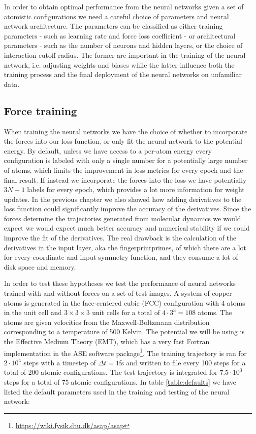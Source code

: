 In order to obtain optimal performance from the neural networks
given a set of atomistic configurations we need a careful choice of parameters
and neural network architecture. The parameters can be classified as either
training parameters - such as learning rate and force loss coefficient -
or architectural parameters - such as the number of neurons and hidden layers,
or the choice of interaction cutoff radius. The former are important
in the training of the neural network, i.e. adjusting weights and biases
while the latter influence both the training process and the final
deployment of the neural networks on unfamiliar data.

\subsection{Force training}
When training the neural networks we have the choice of whether
to incorporate the forces into our loss function, or only fit
the neural network to the potential energy. By default, unless
we have access to a per-atom energy every configuration is labeled
with only a single number for a potentially large number of atoms,
which limits the improvement in loss metrics for every epoch
and the final result. If instead we incorporate the forces into the
loss we have potentially $3N + 1$ labels for every epoch,
which provides a lot more information for weight updates.
In the previous chapter we also showed how adding derivatives to
the loss function could significantly improve the accuracy of the
derivatives. Since the forces determine the trajectories generated
from molecular dynamics we would expect we would expect much better
accuracy and numerical stability if we could improve the fit of
the derivatives.
The real drawback is the calculation of the derivatives in the input layer,
aka the fingerprintprimes, of which there are a lot for every coordinate
and input symmetry function, and they consume a lot of disk space and memory.
\par
In order to test these hypotheses we test the performance of neural networks
trained with and without forces on a set of test images.
A system of copper atoms is generated in the face-centered cubic (FCC)
configuration with 4 atoms in the unit cell and $3 \times 3 \times 3$
unit cells for a total of $4 \cdot 3^3 = 108$ atoms. The
atoms are given velocities from the Maxwell-Boltzmann distribution
corresponding to a temperature of 500 Kelvin. The potential we will
be using is the Effective Medium Theory (EMT), which has a very
fast Fortran implementation in the ASE software package\footnote{
\url{https://wiki.fysik.dtu.dk/asap/asap}}.
The training trajectory is ran for $2 \cdot 10^4$ steps with
a timestep of $\Delta t = 1$fs and written to file every 100 steps
for a total of 200 atomic configurations. The test trajectory is
integrated for $7.5 \cdot 10^3$ steps for a total of 75 atomic configurations.
In table \ref{table:defaults} we have listed the default parameters
used in the training and testing of the neural network:

